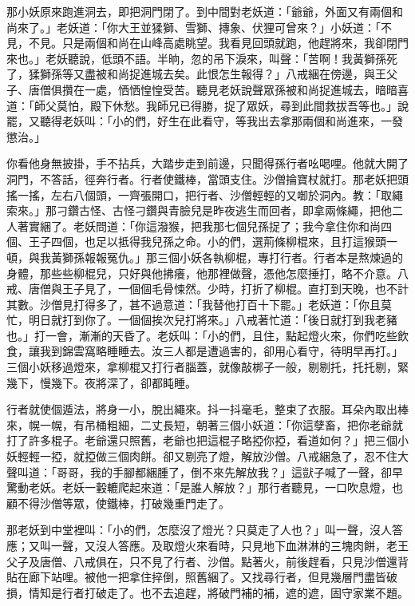 那小妖原來跑進洞去，即把洞門閉了。到中間對老妖道：「爺爺，外面又有兩個和尚來了。」老妖道：「你大王並猱獅、雪獅、摶象、伏狸可曾來？」小妖道：「不見，不見。只是兩個和尚在山峰高處眺望。我看見回頭就跑，他趕將來，我卻閉門來也。」老妖聽說，低頭不語。半晌，忽的吊下淚來，叫聲：「苦啊！我黃獅孫死了，猱獅孫等又盡被和尚捉進城去矣。此恨怎生報得？」八戒綑在傍邊，與王父子、唐僧俱攢在一處，恓恓惶惶受苦。聽見老妖說聲眾孫被和尚捉進城去，暗暗喜道：「師父莫怕，殿下休愁。我師兄已得勝，捉了眾妖，尋到此間救拔吾等也。」說罷，又聽得老妖叫：「小的們，好生在此看守，等我出去拿那兩個和尚進來，一發懲治。」

你看他身無披掛，手不拈兵，大踏步走到前邊，只聞得孫行者吆喝哩。他就大開了洞門，不答話，徑奔行者。行者使鐵棒，當頭支住。沙僧掄寶杖就打。那老妖把頭搖一搖，左右八個頭，一齊張開口，把行者、沙僧輕輕的又啣於洞內。教：「取繩索來。」那刁鑽古怪、古怪刁鑽與青臉兒是昨夜逃生而回者，即拿兩條繩，把他二人著實綑了。老妖問道：「你這潑猴，把我那七個兒孫捉了；我今拿住你和尚四個、王子四個，也足以抵得我兒孫之命。小的們，選荊條柳棍來，且打這猴頭一頓，與我黃獅孫報報冤仇。」那三個小妖各執柳棍，專打行者。行者本是熬煉過的身體，那些些柳棍兒，只好與他拂癢，他那裡做聲，憑他怎麼捶打，略不介意。八戒、唐僧與王子見了，一個個毛骨悚然。少時，打折了柳棍。直打到天晚，也不計其數。沙僧見打得多了，甚不過意道：「我替他打百十下罷。」老妖道：「你且莫忙，明日就打到你了。一個個挨次兒打將來。」八戒著忙道：「後日就打到我老豬也。」打一會，漸漸的天昏了。老妖叫：「小的們，且住，點起燈火來，你們吃些飲食，讓我到錦雲窩略睡睡去。汝三人都是遭過害的，卻用心看守，待明早再打。」三個小妖移過燈來，拿柳棍又打行者腦蓋，就像敲梆子一般，剔剔托，托托剔，緊幾下，慢幾下。夜將深了，卻都盹睡。

行者就使個遁法，將身一小，脫出繩來。抖一抖毫毛，整束了衣服。耳朵內取出棒來，幌一幌，有吊桶粗細，二丈長短，朝著三個小妖道：「你這孽畜，把你老爺就打了許多棍子。老爺還只照舊，老爺也把這棍子略掗你掗，看道如何？」把三個小妖輕輕一掗，就掗做三個肉餅。卻又剔亮了燈，解放沙僧。八戒綑急了，忍不住大聲叫道：「哥哥，我的手腳都綑腫了，倒不來先解放我？」這獃子喊了一聲，卻早驚動老妖。老妖一轂轆爬起來道：「是誰人解放？」那行者聽見，一口吹息燈，也顧不得沙僧等眾，使鐵棒，打破幾重門走了。

那老妖到中堂裡叫：「小的們，怎麼沒了燈光？只莫走了人也？」叫一聲，沒人答應；又叫一聲，又沒人答應。及取燈火來看時，只見地下血淋淋的三塊肉餅，老王父子及唐僧、八戒俱在，只不見了行者、沙僧。點著火，前後趕看，只見沙僧還背貼在廊下站哩。被他一把拿住捽倒，照舊綑了。又找尋行者，但見幾層門盡皆破損，情知是行者打破走了。也不去追趕，將破門補的補，遮的遮，固守家業不題。

